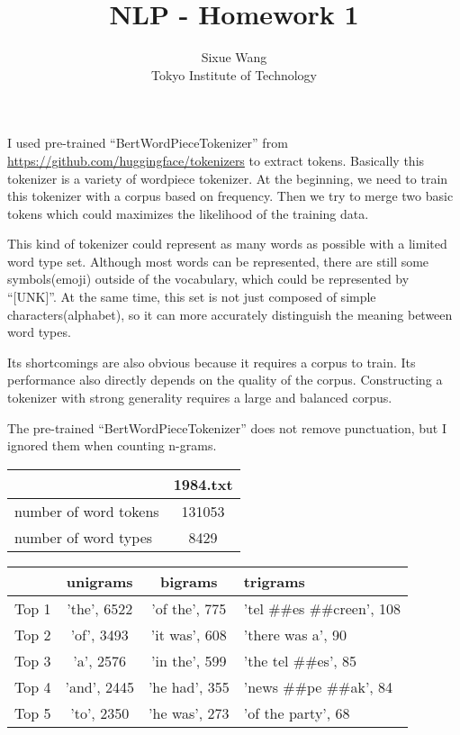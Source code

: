 \documentclass{article}
\title{NLP - Homework 1}
\author{Sixue Wang\\Tokyo Institute of Technology}
\begin{document}
\maketitle

\section{}

I used pre-trained ``BertWordPieceTokenizer'' from
\url{https://github.com/huggingface/tokenizers} to extract tokens. Basically this tokenizer is a variety of wordpiece tokenizer. At the beginning, we need to train this tokenizer with a corpus based on frequency. Then we try to merge two basic tokens which could maximizes the likelihood of the training data.

This kind of tokenizer could represent as many words as possible with a limited word type set. Although most words can be represented, there are still some symbols(emoji) outside of the vocabulary, which could be represented by ``[UNK]''. At the same time, this set is not just composed of simple characters(alphabet), so it can more accurately distinguish the meaning between word types.

Its shortcomings are also obvious because it requires a corpus to train. Its performance also directly depends on the quality of the corpus. Constructing a tokenizer with strong generality requires a large and balanced corpus.

The pre-trained ``BertWordPieceTokenizer'' does not remove punctuation, but I ignored them when counting n-grams.

\medskip
\begin{center}
\begin{tabular}{|l|c|}
\hline
                      & 1984.txt \\ \hline
number of word tokens & 131053   \\ \hline
number of word types  & 8429     \\ \hline
\end{tabular}
\end{center}

\medskip
\begin{center}
\begin{tabular}{|c|c|c|l|}
\hline
      & unigrams    & bigrams       & trigrams                    \\ \hline
Top 1 & 'the', 6522 & 'of the', 775 & 'tel \#\#es \#\#creen', 108 \\ \hline
Top 2 & 'of', 3493  & 'it was', 608 & 'there was a', 90           \\ \hline
Top 3 & 'a', 2576   & 'in the', 599 & 'the tel \#\#es', 85        \\ \hline
Top 4 & 'and', 2445 & 'he had', 355 & 'news \#\#pe \#\#ak', 84    \\ \hline
Top 5 & 'to', 2350  & 'he was', 273 & 'of the party', 68          \\ \hline
\end{tabular}
\end{center}

\section{}



\end{document}

